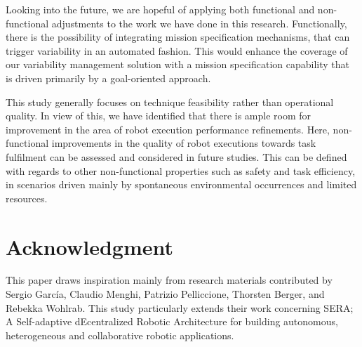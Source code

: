 \documentclass[conference]{IEEEtran}
\begin{document}
Looking into the future, we are hopeful of applying both functional and non-functional adjustments to the work we have done in this research. Functionally, there is the possibility of integrating mission specification mechanisms, that can trigger variability in an automated fashion. This would enhance the coverage of our variability management solution with a mission specification capability that is driven primarily by a goal-oriented approach.

This study generally focuses on technique feasibility rather than operational quality. In view of this, we have identified that there is ample room for improvement in the area of robot execution performance refinements. Here, non-functional improvements in the quality of robot executions towards task fulfilment can be assessed and considered in future studies. This can be defined with regards to other non-functional properties such as safety and task efficiency, in scenarios driven mainly by spontaneous environmental occurrences and limited resources.

\section*{Acknowledgment}
This paper draws inspiration mainly from research materials contributed by Sergio Garc\'{i}a, Claudio Menghi, Patrizio Pelliccione, Thorsten Berger, and Rebekka Wohlrab. This study particularly extends their work concerning SERA; A Self-adaptive dEcentralized Robotic Architecture for building autonomous, heterogeneous and collaborative robotic applications.
\end{document}
